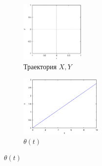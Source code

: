 \begin{figure}
    \centering
    \begin{subfigure}[t]{0.3\textwidth}
        \centering
        \includegraphics[width=\linewidth, height=30mm]{pic/_sol__0_0_1__0__10__1e2_trajectory}
        \caption{Траектория $X, Y$}
        \label{fig:_sol__0_0_1__0__10__1e2_trajectory}
    \end{subfigure}
    \begin{subfigure}[t]{0.3\textwidth}
        \centering
        \includegraphics[width=\linewidth, height=30mm]{pic/_sol__0_0_1__0__10__1e2_theta}
        \caption{$\theta(t)$}
        \label{fig:_sol__0_0_1__0__10__1e2_theta}
    \end{subfigure}
    \vspace{12pt}
    

\end{figure}
